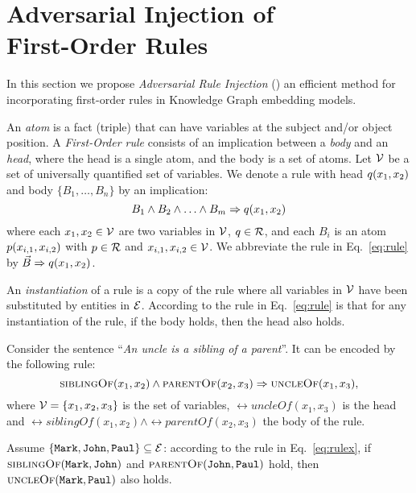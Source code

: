 
\section{Adversarial Injection of\\First-Order Rules} \label{sec:injection}

%
In this section we propose \emph{Adversarial Rule Injection} (\ARI) an efficient method for incorporating first-order rules in Knowledge Graph embedding models.
%

%
An \emph{atom} is a fact (triple) that can have variables at the subject and/or object position.
%
A \emph{First-Order rule} consists of an implication between a \emph{body} and an \emph{head}, where the head is a single atom, and the body is a set of atoms.
%
Let $\mathcal{V}$ be a set of universally quantified set of variables.
%
We denote a rule with head $q(x_{1}, x_{2})$ and body $\{ B_{1}, \ldots, B_{n} \}$ by an implication:
%
\begin{equation} \label{eq:rule}
%
 B_{1} \land B_{2} \land \ldots \land B_{m} \Implies \relq(x_{1}, x_{2})
%
\end{equation}
%
\noindent where each $x_{1}, x_{2} \in \mathcal{V}$ are two variables in $\mathcal{V}$, $q \in \mathcal{R}$, and each $B_{i}$ is an atom $p(x_{i, 1}, x_{i, 2})$ with $p \in \mathcal{R}$ and $x_{i, 1}, x_{i, 2} \in \mathcal{V}$.
%
We abbreviate the rule in Eq.~\ref{eq:rule} by $\vec{B} \Rightarrow q(x_{1}, x_{2})$.

%
An \emph{instantiation} of a rule is a copy of the rule where all variables in $\mathcal{V}$ have been substituted by entities in $\mathcal{E}$.
%
According to the rule in Eq.~\ref{eq:rule} is that for any instantiation of the rule, if the body holds, then the head also holds.
%

%
\begin{example}
%
Consider the sentence ``\emph{An uncle is a sibling of a parent}''.
%
It can be encoded by the following rule:
%
\begin{equation} \label{eq:rulex}
 {\textsc{siblingOf}}(x_{1}, x_{2}) \land {\textsc{parentOf}}(x_{2}, x_{3}) \Rightarrow {\textsc{uncleOf}}(x_{1}, x_{3}),
\end{equation}
%
\noindent where $\mathcal{V} = \{ x_{1}, x_{2}, x_{3} \}$ is the set of variables, $\rel{uncleOf}(x_{1}, x_{3})$ is the head and $\rel{siblingOf}(x_{1}, x_{2}) \land \rel{parentOf}(x_{2}, x_{3})$ the body of the rule.
%

%
Assume $\{ {\texttt{Mark}}, {\texttt{John}}, {\texttt{Paul}} \} \subseteq \mathcal{E}$: according to the rule in Eq.~\ref{eq:rulex}, if ${\textsc{siblingOf}}({\texttt{Mark}}, {\texttt{John}})$ and ${\textsc{parentOf}}({\texttt{John}}, {\texttt{Paul}})$ hold, then ${\textsc{uncleOf}}({\texttt{Mark}}, {\texttt{Paul}})$ also holds.
%
\end{example}
%

